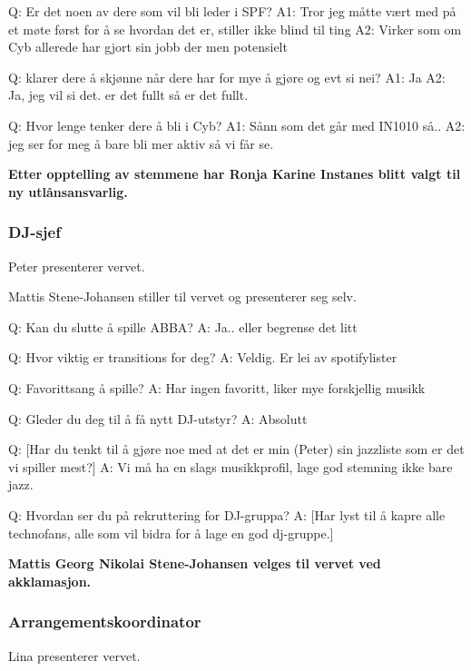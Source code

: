 \documentclass[10pt,norsk,a4paper,usenames,dvipsnames]{article}
\begin{document}
\begin{multicols}{2}
        Q: Er det noen av dere som vil bli leder i SPF?
        A1: Tror jeg måtte vært med på et møte først for å se hvordan det er, stiller ikke blind til ting
        A2: Virker som om Cyb allerede har gjort sin jobb der men potensielt

        Q: klarer dere å skjønne når dere har for mye å gjøre og evt si nei?
        A1: Ja
        A2: Ja, jeg vil si det. er det fullt så er det fullt.

        Q: Hvor lenge tenker dere å bli i Cyb?
        A1: Sånn som det går med IN1010 så..
        A2: jeg ser for meg å bare bli mer aktiv så vi får se.

        \textbf{Etter opptelling av stemmene har Ronja Karine Instanes blitt valgt til ny utlånsansvarlig.}

        \subsubsection{DJ-sjef}
        Peter presenterer vervet.

        Mattis Stene-Johansen stiller til vervet og presenterer seg selv.

        Q: Kan du slutte å spille ABBA?
        A: Ja.. eller begrense det litt

        Q: Hvor viktig er transitions for deg?
        A: Veldig. Er lei av spotifylister

        Q: Favorittsang å spille?
        A: Har ingen favoritt, liker mye forskjellig musikk

        Q: Gleder du deg til å få nytt DJ-utstyr?
        A: Absolutt

        Q: [Har du tenkt til å gjøre noe med at det er min (Peter) sin jazzliste som er det vi spiller mest?]
        A: Vi må ha en slags musikkprofil, lage god stemning ikke bare jazz.

        Q: Hvordan ser du på rekruttering for DJ-gruppa?
        A: [Har lyst til å kapre alle technofans, alle som vil bidra for å lage en god dj-gruppe.]


\textbf{        Mattis Georg Nikolai Stene-Johansen velges til vervet ved akklamasjon.
}

        \subsubsection{Arrangementskoordinator}

            Lina presenterer vervet.


\end{multicols}
\end{document}
